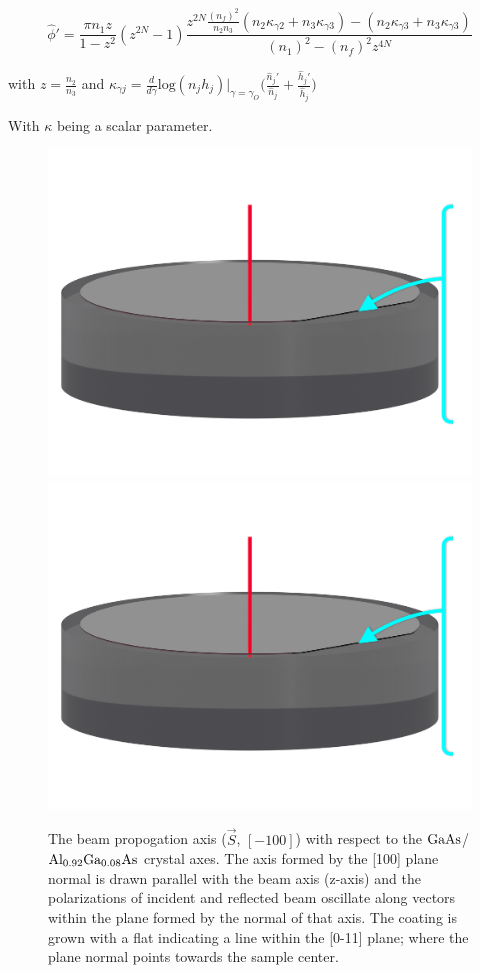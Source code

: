 \begin{equation}
\hat{\phi}' = \frac{\pi n_1 z}{1-z^2}(z^{2N} -1) \frac{z^{2N} \frac{(n_f)^2}{n_2 n_3}(n_2 \kappa_{\gamma 2} + n_3\kappa_{\gamma 3}) - (n_2 \kappa_{\gamma 3} + n_3\kappa_{\gamma 3})}{(n_1)^2 -(n_f)^2 z^{4N}}
\end{equation}

with $z = \frac{n_2}{n_3}$
and
$
\kappa_{\gamma j} = \frac{d}{d \gamma} \mathrm{log}(n_j h_j)|_{\gamma =\gamma_{O}} \bigg(\frac{\hat{n}_j'}{\hat{n}_j} +\frac{\hat{h}_j'}{\hat{h}_j} \bigg)
$

With $\kappa$ being a scalar parameter.

\begin{figure}[!ht]
    \begin{subcaptiongroup}
	    \includegraphics[width=.55\textwidth,page=1]{figs/ALGAAS/ALGAAS_HR_layers_1.pdf}
	    \label{HRiso}
	    \includegraphics[width=.55\textwidth,page=2]{figs/ALGAAS/ALGAAS_HR_layers_1.pdf}
	    \label{HRxsection}
    \end{subcaptiongroup}
\caption{The beam propogation axis ($\vec{S}$, $[-100]$) with respect to the $\mathrm{GaAs}$/$\mathrm{Al_{0.92}Ga_{0.08}As}$ crystal axes. The axis formed by the [100] plane normal is drawn parallel with the beam axis (z-axis) and the polarizations of incident and reflected beam oscillate along vectors within the plane formed by the normal of that axis. The coating is grown with a flat indicating a line within the [0-11] plane; where the plane normal points towards the sample center.}
\label{fig:HRlayers}
\end{figure}


